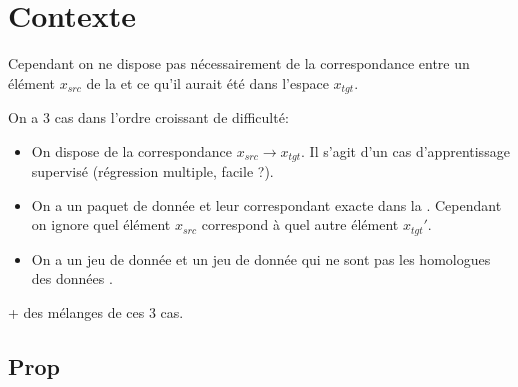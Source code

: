 

\chapter{Contexte}



Cependant on ne dispose pas nécessairement de la correspondance entre un élément $x_{src}$ de 
la \source{} et ce qu'il aurait été dans l'espace \cible{} $x_{tgt}$.

On a 3 cas dans l'ordre croissant de difficulté:
\begin{itemize}
\item On dispose de la correspondance $x_{src}\to x_{tgt}$. 
	Il s'agit d'un cas d'apprentissage supervisé (régression multiple, facile ?).
\item On a un paquet de donnée \source{} et leur correspondant exacte dans la \cible{}.
	Cependant on ignore quel élément $x_{src}$ correspond à quel autre élément $x_{tgt}'$.
\item On a un jeu de donnée \source{} et un jeu de donnée \cible{} 
	qui ne sont pas les homologues des données \sources{}.
\end{itemize}
+ des mélanges de ces 3 cas.


\section{Prop} %
\label{sec:prop}

